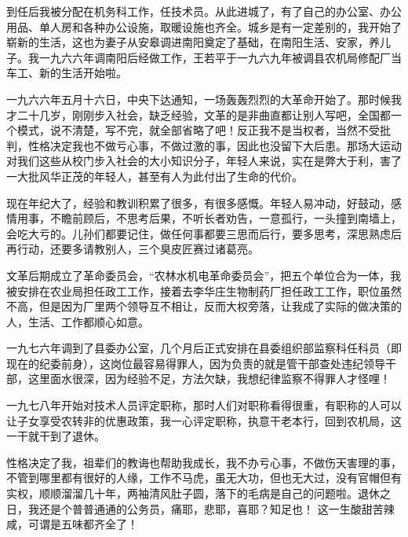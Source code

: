 到任后我被分配在机务科工作，任技术员。从此进城了，有了自己的办公室、办公用品、单人房和各种办公设施，取暖设施也齐全。城乡是有一定差别的，我开始了崭新的生活，这也为妻子从安皋调进南阳奠定了基础，在南阳生活、安家，养儿子。我一九六六年调南阳后经做工作，王若平于一九六九年被调县农机局修配厂当车工、新的生活开始啦。

一九六六年五月十六日，中央下达通知，一场轰轰烈烈的大革命开始了。那时候我才二十几岁，刚刚步入社会，缺乏经验，文革的是非曲直都让别人写吧，全国都一个模式，说不清楚，写不完，就全部省略了吧！反正我不是当权者，当然不受批判，性格决定我也不做亏心事，不做过激的事，因此也没留下大后患。那场大运动对我们这些从校门步入社会的大小知识分子，年轻人来说，实在是弊大于利，害了一大批风华正茂的年轻人，甚至有人为此付出了生命的代价。

现在年纪大了，经验和教训积累了很多，有很多感慨。年轻人易冲动，好鼓动，感情用事，不瞻前顾后，不思考后果，不听长者劝告，一意孤行，一头撞到南墙上，会吃大亏的。儿孙们都要记住，做任何事都要三思而后行，要多思考，深思熟虑后再行动，还要多请教别人，三个臭皮匠赛过诸葛亮。

文革后期成立了革命委员会，“农林水机电革命委员会”，把五个单位合为一体，我被安排在农业局担任政工工作，接着去李华庄生物制药厂担任政工工作，职位虽然不高，但是因为厂里两个领导互不相让，反而大权旁落，让我成了实际的做决策的人，生活、工作都顺心如意。

一九七六年调到了县委办公室，几个月后正式安排在县委组织部监察科任科员（即现在的纪委前身），这岗位最容易得罪人，因为负责的就是管干部查处违纪领导干部，这里面水很深，因为经验不足，方法欠缺，我想纪律监察不得罪人才怪哩！

一九七八年开始对技术人员评定职称，那时人们对职称看得很重，有职称的人可以让子女享受农转非的优惠政策，我一心评定职称，执意干老本行，回到农机局，这一干就干到了退休。

性格决定了我，祖辈们的教诲也帮助我成长，我不办亏心事，不做伤天害理的事，不管到哪里都有很好的人缘，工作不马虎，虽无大功，但也无大过，没有官帽但有实权，顺顺溜溜几十年，两袖清风肚子圆，落下的毛病是自己的问题啦。退休之日，我还是个普普通通的公务员，痛耶，悲耶，喜耶？知足也！ 这一生酸甜苦辣咸，可谓是五味都齐全了！

